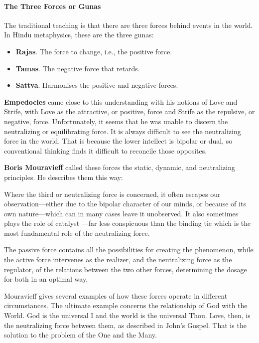 \paragraph{The Three Forces or Gunas}
The traditional teaching is that there are three forces behind events in the world. In Hindu metaphysics, these are the three gunas:

\begin{itemize}
\item \textbf{Rajas}. The force to change, i.e., the positive force. 
\item \textbf{Tamas}. The negative force that retards. 
\item \textbf{Sattva}. Harmonises the positive and negative forces. 
\end{itemize}
\textbf{Empedocles} came close to this understanding with his notions of Love and Strife, with Love as the attractive, or positive, force and Strife as the repulsive, or negative, force. Unfortunately, it seems that he was unable to discern the neutralizing or equilibrating force. It is always difficult to see the neutralizing force in the world. That is because the lower intellect is bipolar or dual, so conventional thinking finds it difficult to reconcile those opposites.

\textbf{Boris Mouravieff} called these forces the static, dynamic, and neutralizing principles. He describes them this way:

\begin{quotex}
Where the third or neutralizing force is concerned, it often escapes our observation—either due to the bipolar character of our minds, or because of its own nature—which can in many cases leave it unobserved. It also sometimes plays the role of catalyst —far less conspicuous than the binding tie which is the most fundamental role of the neutralizing force.

The passive force contains all the possibilities for creating the phenomenon, while the active force intervenes as the realizer, and the neutralizing force as the regulator, of the relations between the two other forces, determining the dosage for both in an optimal way.

\end{quotex}
Mouravieff gives several examples of how these forces operate in different circumstances. The ultimate example concerns the relationship of God with the World. God is the universal I and the world is the universal Thou. Love, then, is the neutralizing force between them, as described in John's Gospel. That is the solution to the problem of the One and the Many.

